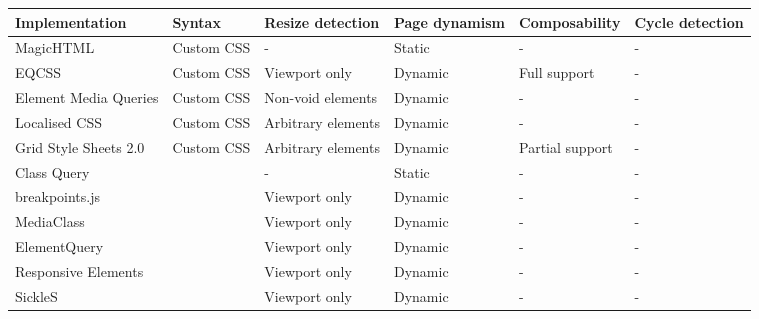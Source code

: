 \documentclass{acm_proc_article-sp}
\begin{document}
\begin{table*}[ht!]\center
    \tiny
    \begin{tabular}[t]{ p{3cm} l l l l l }
      Implementation & Syntax & Resize detection & Page dynamism  & Composability & Cycle detection \\
      \hline
       MagicHTML \cite{eq_imp_magichtml}                          &                       Custom CSS  &   - &                             Static &     -                  & -  \\
       EQCSS \cite{eq_imp_eqcss}                                  &                       Custom CSS  &   Viewport only &                 Dynamic &    Full support       & -  \\
       Element Media Queries \cite{eq_imp_prollyfill-min-width}   &                       Custom CSS  &   Non-void elements &             Dynamic &    -                  & -  \\
       Localised CSS \cite{eq_imp_localised-css}                  &                       Custom CSS  &   Arbitrary elements &            Dynamic &    -                  & -  \\
       Grid Style Sheets 2.0 \cite{eq_imp_gss}                    &                       Custom CSS  &   Arbitrary elements &            Dynamic &    Partial support    & -  \\
       Class Query \cite{eq_imp_classquery}                       &                                   &   - &                             Static &     -                  & -  \\
       breakpoints.js \cite{eq_imp_breakpointsjs}                 &                                   &   Viewport only &                 Dynamic &    -                  & -  \\
       MediaClass \cite{eq_imp_mediaclass}                        &                                   &   Viewport only &                 Dynamic &    -                  & -  \\
       ElementQuery \cite{eq_imp_elementquery}                    &                                   &   Viewport only &                 Dynamic &    -                  & -  \\
       Responsive Elements \cite{eq_imp_responsive-elements}      &                                   &   Viewport only &                 Dynamic &    -                  & -  \\
       SickleS \cite{eq_imp_sickles}                              &                                   &   Viewport only &                 Dynamic &    -                  & -  \\

\end{tabular}
\end{table*}
\end{document}
